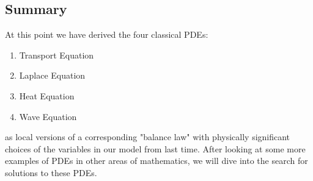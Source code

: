 \documentclass{bkcnotes}
\begin{document}
\subsection{Summary}
At this point we have derived the four classical PDEs:
\begin{enumerate}
\item Transport Equation
\item Laplace Equation
\item Heat Equation
\item Wave Equation
\end{enumerate}
as local versions of a corresponding "balance law" with physically
significant choices of the variables in our model from last
time. After looking at some more examples of PDEs in other areas of
mathematics, we will dive into the search for solutions to these PDEs.
\end{document}
